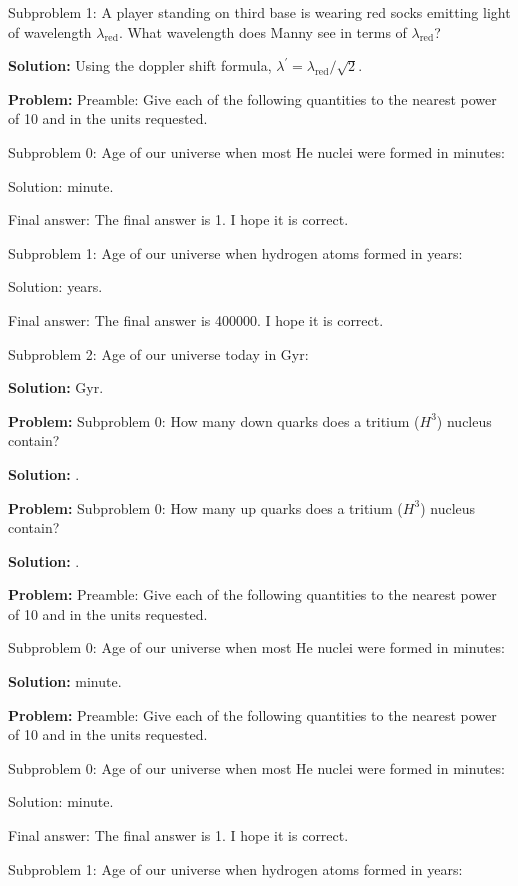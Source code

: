 \documentclass[10pt]{article}
\begin{document}
Subproblem 1: A player standing on third base is wearing red socks emitting light of wavelength $\lambda_{\text {red}}$. What wavelength does Manny see in terms of $\lambda_{\text {red}}$?


\textbf{Solution:}
Using the doppler shift formula, $\lambda^{\prime}= \boxed{\lambda_{\text {red}} / \sqrt{2}}$.


\textbf{Problem:}
Preamble: Give each of the following quantities to the nearest power of 10 and in the units requested. 

Subproblem 0: Age of our universe when most He nuclei were formed in minutes: 


Solution:  minute.

Final answer: The final answer is 1. I hope it is correct.

Subproblem 1: Age of our universe when hydrogen atoms formed in years:


Solution:  years.

Final answer: The final answer is 400000. I hope it is correct.

Subproblem 2: Age of our universe today in Gyr:


\textbf{Solution:}
 Gyr.


\textbf{Problem:}
Subproblem 0: How many down quarks does a tritium ($H^3$) nucleus contain?


\textbf{Solution:}
.


\textbf{Problem:}
Subproblem 0: How many up quarks does a tritium ($H^3$) nucleus contain?


\textbf{Solution:}
.


\textbf{Problem:}
Preamble: Give each of the following quantities to the nearest power of 10 and in the units requested. 

Subproblem 0: Age of our universe when most He nuclei were formed in minutes: 


\textbf{Solution:}
 minute.


\textbf{Problem:}
Preamble: Give each of the following quantities to the nearest power of 10 and in the units requested. 

Subproblem 0: Age of our universe when most He nuclei were formed in minutes: 


Solution:  minute.

Final answer: The final answer is 1. I hope it is correct.

Subproblem 1: Age of our universe when hydrogen atoms formed in years:
\end{document}
